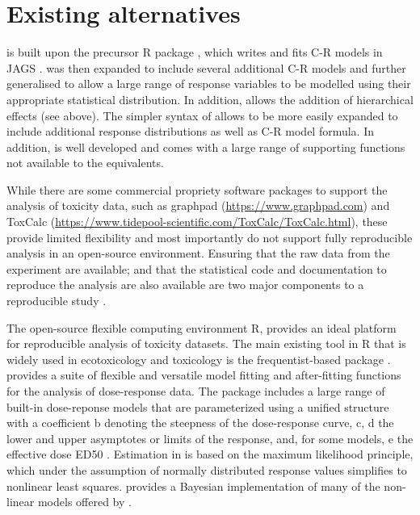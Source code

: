 \documentclass[
  shortnames]{jss}
\begin{document}
\section[Existing alternatives]{Existing alternatives}\label{bnchmrk}

 is built upon the precursor R package  \citep{fisher2020}, which writes and fits C-R models in JAGS \citep{Plummer2003}.  was then expanded to include several additional C-R models and further generalised to allow a large range of response variables to be modelled using their appropriate statistical distribution. In addition,  allows the addition of hierarchical effects (see above). The simpler syntax of  allows  to be more easily expanded to include additional response distributions as well as C-R model formula. In addition,  is well developed and comes with a large range of supporting functions not available to the  equivalents.

While there are some commercial propriety software packages to support the analysis of toxicity data, such as graphpad (\url{https://www.graphpad.com}) and ToxCalc (\url{https://www.tidepool-scientific.com/ToxCalc/ToxCalc.html}), these provide limited flexibility and most importantly do not support fully reproducible analysis in an open-source environment. Ensuring that the raw data from the experiment are available; and that the statistical code and documentation to reproduce the analysis are also available are two major components to a reproducible study \citep{peng2015}.

The open-source flexible computing environment R, provides an ideal platform for reproducible analysis of toxicity datasets. The main existing tool in R that is widely used in ecotoxicology and toxicology is the frequentist-based package  \citep{Ritz2016}.  provides a suite of flexible and versatile model fitting and after-fitting functions for the analysis of dose-response data. The package includes a large range of built-in dose-reponse models that are parameterized using a unified structure with a coefficient b denoting the steepness of the dose-response curve, c, d the lower and upper asymptotes or limits of the response, and, for some models, e the effective dose ED50 \citep{Ritz2016}. Estimation in  is based on the maximum likelihood principle, which under the assumption of normally distributed response values simplifies to nonlinear least squares.  provides a Bayesian implementation of many of the non-linear models offered by .
\end{document}
